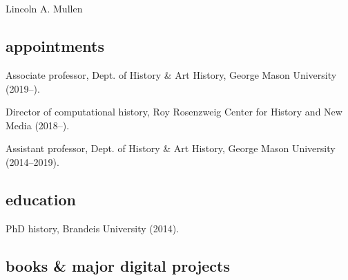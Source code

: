 \documentclass[11pt]{article}
\begin{document}
\thispagestyle{fancy}
\fancyfoot{}
\fancyhead{}
\renewcommand{\headrulewidth}{0pt}

\hfill\hfill\hfill
\hfill\hfill\hfill
\hfill\hfill\hfill
\hfill\hfill\hfill
\begin{minipage}[t]{1.6in}
   \\
   \\
\end{minipage}
\hfill
\begin{minipage}[t]{1.9in}
\end{minipage}

\vspace{0.1in}

{\Large Lincoln A. Mullen}\\[-0.1in]

\subsection{appointments}\label{Appointments}


Associate professor, Dept. of History \& Art History, George Mason University (2019--).

Director of computational history, Roy Rosenzweig Center for History and New Media (2018--).

Assistant professor, Dept. of History \& Art History, George Mason University (2014--2019).

\subsection{education}\label{education}

PhD history, Brandeis University (2014). 

\subsection{books \& major digital projects}\label{books}
\end{document}
